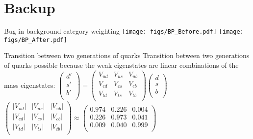 \section*{Backup}
\begin{frame}[noframenumbering]{Bug in background category weighting}
\centering
\texttt{[image: figs/BP\_Before.pdf]}
\texttt{[image: figs/BP\_After.pdf]}
\end{frame}
\begin{frame}[noframenumbering]{Transition between two generations of quarks}
\bi
\itemiii Transition between two generations of quarks possible because the weak eigenstates are linear combinations of the mass eigenstates:
\ei
\vspace{1.0cm}
\centering
{
$
\begin{pmatrix}
d'\\
s'\\
b'\\
\end{pmatrix}
=
\begin{pmatrix}
V_{ud} & V_{us} & V_{ub} \\
V_{cd} & V_{cs} & V_{cb} \\
V_{td} & V_{ts} & V_{tb} \\
\end{pmatrix}
\begin{pmatrix}
d\\
s\\
b\\
\end{pmatrix}
$
\\
\vspace{1.0cm}
$
\begin{pmatrix}
|V_{ud}| & |V_{us}| & |V_{ub}| \\
|V_{cd}| & |V_{cs}| & |V_{cb}| \\
|V_{td}| & |V_{ts}| & |V_{tb}| \\
\end{pmatrix}
\approx
\begin{pmatrix}
0.974 & 0.226 & 0.004 \\
0.226 & 0.973 & 0.041 \\
0.009 & 0.040 & 0.999 \\
\end{pmatrix}
$
}
\end{frame}
